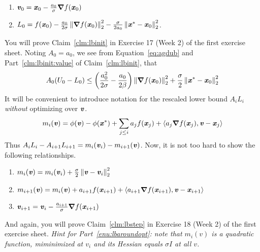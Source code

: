 \newpage

 \begin{claim}
   \label{clm:lbinit}
   \noindent
   \begin{enumerate}
   \item $\boldsymbol{\mathit{v}}_0 = \boldsymbol{\mathit{x}}_0 - \frac{a_0}{\sigma} \boldsymbol{\nabla} f(\boldsymbol{\mathit{x}}_0)$
   \item
     \label{clm:lbinit:value}
     $L_0 = f(\boldsymbol{\mathit{x}}_0) - \frac{a_0}{2\sigma} \left\| \boldsymbol{\nabla} f(\boldsymbol{\mathit{x}}_0)
      \right\|_2^2 - \frac{\sigma }{2 a_0}\left\|  \boldsymbol{\mathit{x}}^* - \boldsymbol{\mathit{x}}_0 \right\|_2^2 $.
\end{enumerate}
\end{claim}
You will prove Claim~\ref{clm:lbinit} in Exercise 17 (Week 2) of the
first exercise sheet.
Noting $A_0 = a_0$,
we see from Equation~\eqref{eq:agdub} and Part~\ref{clm:lbinit:value}
of Claim~\ref{clm:lbinit}, that
\begin{align}
  \label{eq:gapinit}
  A_0( U_0 - L_0 ) \leq
  \left(
  \frac{a_0^2}{2\sigma}
  -
    \frac{a_0}{2\beta}
  \right)
  \left\| \boldsymbol{\nabla} f(\boldsymbol{\mathit{x}}_0) \right\|_2^2
    +
    \frac{\sigma }{2}\left\|  \boldsymbol{\mathit{x}}^* - \boldsymbol{\mathit{x}}_0 \right\|_2^2
\end{align}
It will be convenient to introduce notation for the
rescaled lower bound $A_iL_i$ \emph{without} optimizing over $\boldsymbol{\mathit{v}}$.
\[
  m_i(\boldsymbol{\mathit{v}}) =
  \phi(\boldsymbol{\mathit{v}})
   - \phi(\boldsymbol{\mathit{x}}^*)
  +
  \sum_{j \leq i} a_j  f(\boldsymbol{\mathit{x}}_j)
    + \left<  a_j\boldsymbol{\nabla}
      f(\boldsymbol{\mathit{x}}_{j}) ,\boldsymbol{\mathit{v}} - \boldsymbol{\mathit{x}}_j \right>
  \]
Thus $A_iL_i-A_{i+1}L_{i+1} = m_{i}(\boldsymbol{\mathit{v}}_i) - m_{i+1}(\boldsymbol{\mathit{v}})$.
Now, it is not too hard to show the
following relationships.
\begin{claim}
  \label{clm:lbstep}
   \noindent
   \begin{enumerate}
   \item
     \label{enu:lbaroundopt}
     $ m_{i}(\boldsymbol{\mathit{v}}) = m_{i}(\boldsymbol{\mathit{v}}_i) + \frac{\sigma}{2} \left\|  \boldsymbol{\mathit{v}} -
   \boldsymbol{\mathit{v}}_i \right\|_2^2$
   \item  $m_{i+1}(\boldsymbol{\mathit{v}}) = m_{i}(\boldsymbol{\mathit{v}})
     + a_{i+1}  f(\boldsymbol{\mathit{x}}_{i+1})
     + \left<  a_{i+1}\boldsymbol{\nabla}
      f(\boldsymbol{\mathit{x}}_{i+1}) ,\boldsymbol{\mathit{v}} - \boldsymbol{\mathit{x}}_{i+1} \right>$
  \item  $\boldsymbol{\mathit{v}}_{i+1} = \boldsymbol{\mathit{v}}_i -  \frac{a_{i+1}}{\sigma} \boldsymbol{\nabla} f(\boldsymbol{\mathit{x}}_{i+1})$
   \end{enumerate}
 \end{claim}
And again, you will prove Claim~\ref{clm:lbstep} in Exercise 18 (Week
2) of the first exercise sheet.
\emph{Hint for Part~\ref{enu:lbaroundopt}: note that $m_i(v)$ is a quadratic function, miminimized at $v_i$ and
  its Hessian equals $\sigma I$ at all $v$.}


